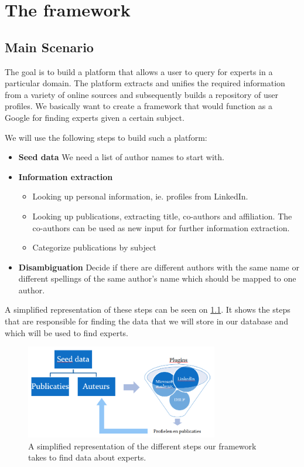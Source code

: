 \chapter{The framework}

\section{Main Scenario}

The goal is to build a platform that allows a user to query for experts in a particular domain. The
platform extracts and unifies the required information from a variety of online sources and
subsequently builds a repository of user profiles. We basically want to create a framework that would function as a Google for finding experts given a certain subject.

We will use the following steps to build such a platform:


\begin{itemize}
	\item \textbf{Seed data} We need a list of author names to start with.
	\item \textbf{Information extraction}
		\begin{itemize}
			\item Looking up personal information, ie. profiles from LinkedIn.
			\item Looking up publications, extracting title, co-authors and affiliation. The co-authors can be used as new input for further information extraction.
			\item Categorize publications by subject
		\end{itemize}
	\item \textbf{Disambiguation} Decide if there are different authors with the same name or different spellings of the same author's name which should be mapped to one author.
\end{itemize}

A simplified representation of these steps can be seen on \ref{fig:db-gegevens}. It shows the steps that are responsible for finding the data that we will store in our database and which will be used to find experts.

\begin{figure}[htbp]
	\centering
		\includegraphics[width=0.75\textwidth]{fig/database-gegevens.png}
	\caption{A simplified representation of the different steps our framework takes to find data about experts.}
	\label{fig:db-gegevens}
\end{figure}

